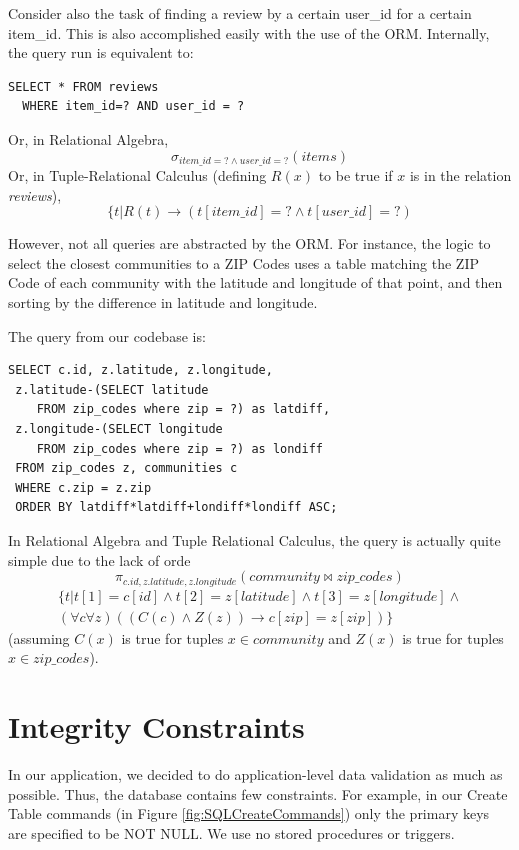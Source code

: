 \documentclass{acm_proc_article-sp}
\begin{document}
Consider also the task of finding a review by a certain user\_id for a certain item\_id. This is also
accomplished easily with the use of the ORM. Internally, the query run is equivalent to:
\begin{lstlisting}
SELECT * FROM reviews 
  WHERE item_id=? AND user_id = ?
\end{lstlisting}
Or, in Relational Algebra,
\[ \sigma_{item\_id=? \land user\_id=?}(\textit{items}) \]
Or, in Tuple-Relational Calculus (defining $R(x)$ to be true if $x$ is in the relation \textit{reviews}),
\[ \{ t | R(t) \to (t[item\_id]=? \land t[user\_id]=?) \]

However, not all queries are abstracted by the ORM. For instance, the logic to select the closest
communities to a ZIP Codes uses a table matching the ZIP Code of each community with the latitude and
longitude of that point, and then sorting by the difference in latitude and longitude.

The query from our codebase is:
\begin{lstlisting}
SELECT c.id, z.latitude, z.longitude, 
 z.latitude-(SELECT latitude 
    FROM zip_codes where zip = ?) as latdiff, 
 z.longitude-(SELECT longitude 
    FROM zip_codes where zip = ?) as londiff 
 FROM zip_codes z, communities c 
 WHERE c.zip = z.zip 
 ORDER BY latdiff*latdiff+londiff*londiff ASC;
\end{lstlisting}

In Relational Algebra and Tuple Relational Calculus, the query is actually quite simple due to the lack of orde
\[ \pi_{c.id,z.latitude,z.longitude}(\textit{community}\bowtie\textit{zip\_codes}) \]
\[ 
\begin{split}\{ t | t[1] = c[id] \land t[2] = z[latitude] \land t[3] = z[longitude] \land \\
(\forall c\forall z)((C(c) \land Z(z)) \to c[zip] = z[zip])
\}
\end{split}
\]
(assuming $C(x)$ is true for tuples $x \in \textit{community}$ and $Z(x)$ is true for tuples $x \in \textit{zip\_codes}$).

\section{Integrity Constraints}
In our application, we decided to do application-level data validation as much as possible. Thus, the database
contains few constraints. For example, in our Create Table commands (in Figure \ref{fig:SQLCreateCommands}) only
the primary keys are specified to be NOT NULL. We use no stored procedures or triggers.
\end{document}
